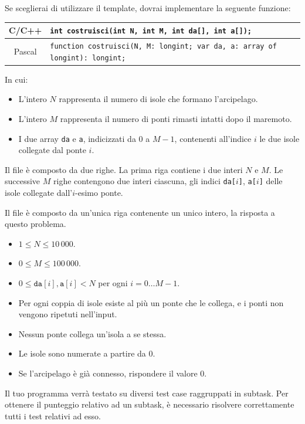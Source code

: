Se sceglierai di utilizzare il template, dovrai implementare la seguente funzione:
\begin{center}\begin{tabularx}{\textwidth}{|c|X|}
\hline
C/C++  & \verb|int costruisci(int N, int M, int da[], int a[]);|\\
\hline
Pascal & \verb|function costruisci(N, M: longint; var da, a: array of longint): longint;|\\
\hline
\end{tabularx}\end{center}

In cui:
\begin{itemize}[nolistsep]
  \item L'intero $N$ rappresenta il numero di isole che formano l'arcipelago.
  \item L'intero $M$ rappresenta il numero di ponti rimasti intatti dopo il maremoto.
  \item I due array \texttt{da} e \texttt{a}, indicizzati da $0$ a $M-1$, contenenti all'indice $i$ le due isole collegate dal ponte $i$.
\end{itemize}

\InputFile
Il file  è composto da due righe. La prima riga contiene i due interi $N$ e $M$. Le successive $M$ righe contengono due interi ciascuna, gli indici \texttt{da[$i$]}, \texttt{a[$i$]} delle isole collegate dall'$i$-esimo ponte.

\OutputFile
Il file \outputfile{} è composto da un'unica riga contenente un unico intero, la risposta a questo problema.

\Constraints
\begin{itemize}[nolistsep, itemsep=2mm]
	\item $1 \le N \le 10\,000$.
	\item $0 \le M \le 100\,000$.
	\item $0 \le \texttt{da}[i], \texttt{a}[i] < N$ per ogni $i=0\ldots M-1$.
	\item Per ogni coppia di isole esiste al più un ponte che le collega, e i ponti non vengono ripetuti nell'input.
	\item Nessun ponte collega un'isola a se stessa.
	\item Le isole sono numerate a partire da 0.
	\item Se l'arcipelago è già connesso, rispondere il valore 0.
\end{itemize}

\Scoring
Il tuo programma verrà testato su diversi test case raggruppati in subtask.
Per ottenere il punteggio relativo ad un subtask, è necessario risolvere
correttamente tutti i test relativi ad esso.

